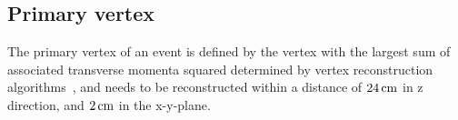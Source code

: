 
\subsection{Primary vertex}
The primary vertex of an event is defined by the vertex with the largest sum of associated transverse momenta squared determined by vertex reconstruction algorithms~\cite{vertex}, and needs to be reconstructed within a distance of $24\,\text{cm}$ in z direction, and $2\,\text{cm}$ in the x-y-plane.


